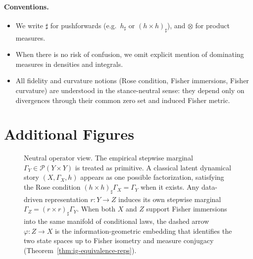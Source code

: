 \documentclass[11pt]{article}
\newcommand{\1}{\mathbf{1}}
\begin{document}
\paragraph{Conventions.}
\begin{itemize}[leftmargin=1.7em,itemsep=2pt,topsep=2pt]
  \item We write $\sharp$ for pushforwards (e.g.\ $h_\sharp$ or $(h\times h)_\sharp$), and $\otimes$ for product measures.
  \item When there is no risk of confusion, we omit explicit mention of dominating measures in densities and integrals.
  \item All fidelity and curvature notions (Rose condition, Fisher immersions, Fisher curvature) are understood in the stance-neutral sense: they depend only on divergences through their common zero set and induced Fisher metric.
\end{itemize}
\newpage


\section{Additional Figures}


\begin{figure}[H]
  \centering
  \caption{%
  Neutral operator view. The empirical stepwise marginal $\Gamma_Y \in \mathcal{P}(Y\times Y)$ is treated as primitive. A classical latent dynamical story $(X,\Gamma_X,h)$ appears as one possible factorization, satisfying the Rose condition $(h\times h)_{\sharp}\Gamma_X = \Gamma_Y$ when it exists. Any data-driven representation $r:Y\to Z$ induces its own stepwise marginal $\Gamma_Z = (r\times r)_{\sharp}\Gamma_Y$. When both $X$ and $Z$ support Fisher immersions into the same manifold of conditional laws, the dashed arrow $\varphi:Z\to X$ is the information-geometric embedding that identifies the two state spaces up to Fisher isometry and measure conjugacy (Theorem~\ref{thm:ig-equivalence-reps}).%
  }
  \label{fig:neutral-operator-diagram}
\end{figure}
\end{document}
